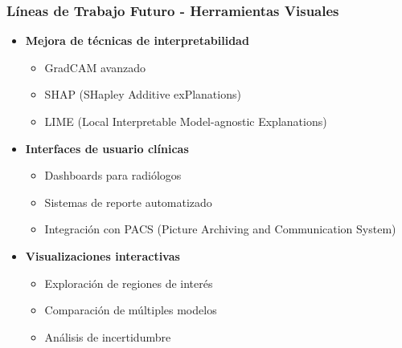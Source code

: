 \begin{frame}
\frametitle{Líneas de Trabajo Futuro - Herramientas Visuales}
\begin{itemize}
    \item \textbf{Mejora de técnicas de interpretabilidad}
    \begin{itemize}
        \item GradCAM avanzado
        \item SHAP (SHapley Additive exPlanations)
        \item LIME (Local Interpretable Model-agnostic Explanations)
    \end{itemize}
    \item \textbf{Interfaces de usuario clínicas}
    \begin{itemize}
        \item Dashboards para radiólogos
        \item Sistemas de reporte automatizado
        \item Integración con PACS (Picture Archiving and Communication System)
    \end{itemize}
    \item \textbf{Visualizaciones interactivas}
    \begin{itemize}
        \item Exploración de regiones de interés
        \item Comparación de múltiples modelos
        \item Análisis de incertidumbre
    \end{itemize}
\end{itemize}
\end{frame}

